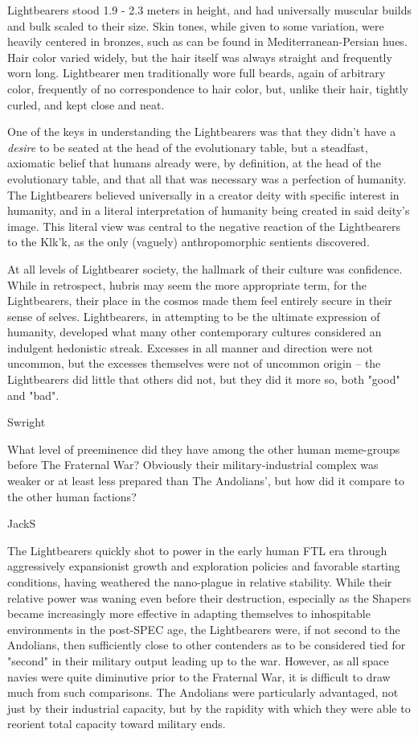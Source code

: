 Lightbearers stood 1.9 - 2.3 meters in height, and had universally
muscular builds and bulk scaled to their size. Skin tones, while given
to some variation, were heavily centered in bronzes, such as can be
found in Mediterranean-Persian hues. Hair color varied widely, but the
hair itself was always straight and frequently worn long. Lightbearer
men traditionally wore full beards, again of arbitrary color,
frequently of no correspondence to hair color, but, unlike their hair,
tightly curled, and kept close and neat.

One of the keys in understanding the Lightbearers was that they didn't
have a {\em desire} to be seated at the head of the evolutionary table,
but a steadfast, axiomatic belief that humans already were, by
definition, at the head of the evolutionary table, and that all that
was necessary was a perfection of humanity. The Lightbearers believed
universally in a creator deity with specific interest in humanity, and
in a literal interpretation of humanity being created in said deity's
image. This literal view was central to the negative reaction of the
Lightbearers to the Klk'k, as the only (vaguely) anthropomorphic
sentients discovered.

At all levels of Lightbearer society, the hallmark of their culture
was confidence. While in retrospect, hubris may seem the more
appropriate term, for the Lightbearers, their place in the cosmos made
them feel entirely secure in their sense of selves. Lightbearers, in
attempting to be the ultimate expression of humanity, developed what
many other contemporary cultures considered an indulgent hedonistic
streak. Excesses in all manner and direction were not uncommon, but
the excesses themselves were not of uncommon origin -- the
Lightbearers did little that others did not, but they did it more so,
both "good" and "bad".

Swright

What level of preeminence did they have among the other human
meme-groups before The Fraternal War? Obviously their
military-industrial complex was weaker or at least less prepared than
The Andolians', but how did it compare to the other human factions?

JackS

The Lightbearers quickly shot to power in the early human FTL era
through aggressively expansionist growth and exploration policies and
favorable starting conditions, having weathered the nano-plague in
relative stability. While their relative power was waning even before
their destruction, especially as the Shapers became increasingly more
effective in adapting themselves to inhospitable environments in the
post-SPEC age, the Lightbearers were, if not second to the Andolians,
then sufficiently close to other contenders as to be considered tied
for "second" in their military output leading up to the war. However,
as all space navies were quite diminutive prior to the Fraternal War,
it is difficult to draw much from such comparisons. The Andolians were
particularly advantaged, not just by their industrial capacity, but by
the rapidity with which they were able to reorient total capacity
toward military ends.

